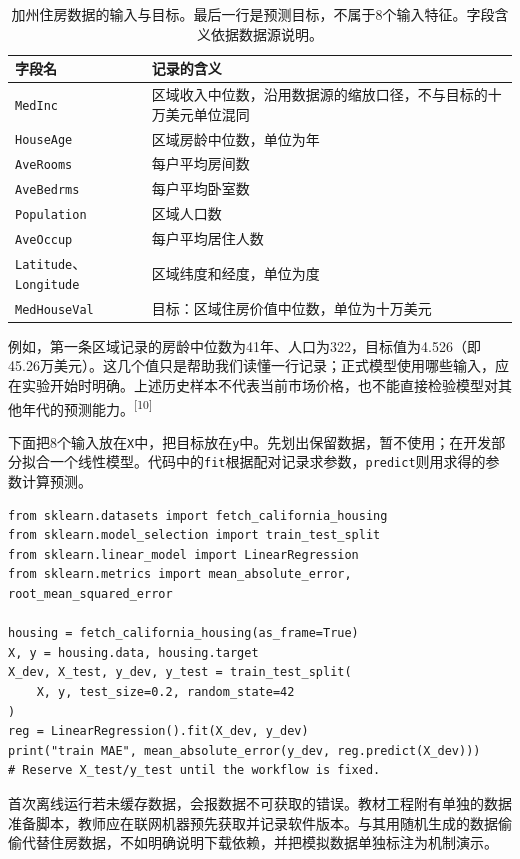 \begin{table}[htbp]\centering\small
\begin{tabularx}{\linewidth}{lX}
\toprule 字段名 & 记录的含义 \\\midrule
\texttt{MedInc} & 区域收入中位数，沿用数据源的缩放口径，不与目标的十万美元单位混同 \\
\texttt{HouseAge} & 区域房龄中位数，单位为年 \\
\texttt{AveRooms} & 每户平均房间数 \\
\texttt{AveBedrms} & 每户平均卧室数 \\
\texttt{Population} & 区域人口数 \\
\texttt{AveOccup} & 每户平均居住人数 \\
\texttt{Latitude}、\texttt{Longitude} & 区域纬度和经度，单位为度 \\
\texttt{MedHouseVal} & 目标：区域住房价值中位数，单位为十万美元 \\
\bottomrule
\end{tabularx}
\caption{加州住房数据的输入与目标。最后一行是预测目标，不属于8个输入特征。字段含义依据数据源说明。}
\end{table}

例如，第一条区域记录的房龄中位数为41年、人口为322，目标值为4.526（即45.26万美元）。这几个值只是帮助我们读懂一行记录；正式模型使用哪些输入，应在实验开始时明确。上述历史样本不代表当前市场价格，也不能直接检验模型对其他年代的预测能力。\textsuperscript{[10]}

下面把8个输入放在\texttt{X}中，把目标放在\texttt{y}中。先划出保留数据，暂不使用；在开发部分拟合一个线性模型。代码中的\texttt{fit}根据配对记录求参数，\texttt{predict}则用求得的参数计算预测。

\begin{lstlisting}[caption={加州住房数据的读取与基线回归（首次运行需联网）}]
from sklearn.datasets import fetch_california_housing
from sklearn.model_selection import train_test_split
from sklearn.linear_model import LinearRegression
from sklearn.metrics import mean_absolute_error, root_mean_squared_error

housing = fetch_california_housing(as_frame=True)
X, y = housing.data, housing.target
X_dev, X_test, y_dev, y_test = train_test_split(
    X, y, test_size=0.2, random_state=42
)
reg = LinearRegression().fit(X_dev, y_dev)
print("train MAE", mean_absolute_error(y_dev, reg.predict(X_dev)))
# Reserve X_test/y_test until the workflow is fixed.
\end{lstlisting}

首次离线运行若未缓存数据，会报数据不可获取的错误。教材工程附有单独的数据准备脚本，教师应在联网机器预先获取并记录软件版本。与其用随机生成的数据偷偷代替住房数据，不如明确说明下载依赖，并把模拟数据单独标注为机制演示。

